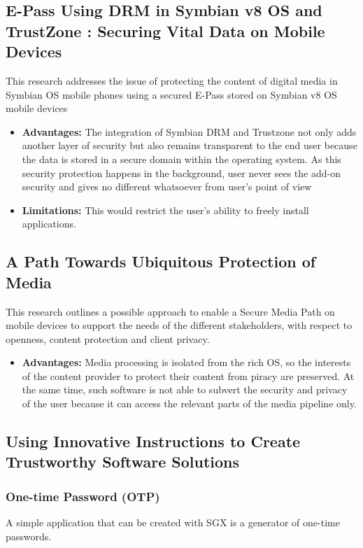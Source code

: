 \documentclass[conference]{IEEEtran}
\begin{document}
\subsection{E-Pass Using DRM in Symbian v8 OS and TrustZone : Securing Vital Data on Mobile Devices}
\cite{trust3} This research addresses the issue of protecting the content of digital media in Symbian OS mobile phones using a secured E-Pass stored on Symbian v8 OS mobile devices
\begin{itemize}
    \item \textbf{Advantages:}  The integration of Symbian DRM and Trustzone not only adds another layer of security but also remains transparent to the end user because the data is stored in a secure domain within the operating system. As this security protection happens in the background, user never sees the add-on security and gives no different whatsoever from user’s point of view
    \item \textbf{Limitations:} This would restrict the user's ability to freely install applications.
\end{itemize}


\subsection{A Path Towards Ubiquitous Protection of Media}
\cite{trust4} This research outlines a possible approach to enable a Secure Media Path on mobile devices to support the needs of the different stakeholders, with respect to openness, content protection and client privacy.
\begin{itemize}
    \item \textbf{Advantages:}  Media processing is isolated from the rich OS,  so the interests of the content provider to protect their content from piracy are preserved. At the same time, such software is not able to subvert the security and privacy of the user because it can access the relevant parts of the media pipeline only.
\end{itemize}

\subsection{Using Innovative Instructions to Create Trustworthy Software Solutions}
\subsubsection{One-time Password (OTP)}
\cite{trust5-7} A simple application that can be created with SGX is a generator of one-time passwords.
\end{document}
